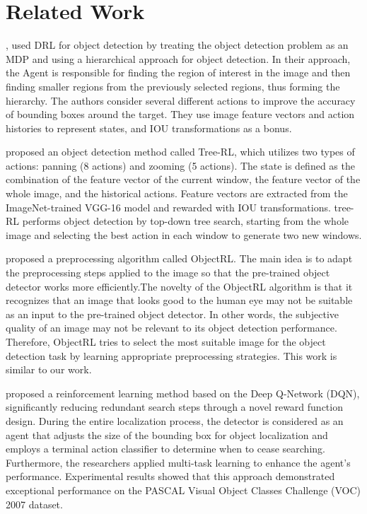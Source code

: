 \documentclass{PHlab-thesis}
\begin{document}
\section{Related Work}
\cite{caicedo2015active}, \cite{bueno2017hierarchical} used DRL for object detection by treating the object detection problem as an MDP and using a hierarchical approach for object detection. In their approach, the Agent is responsible for finding the region of interest in the image and then finding smaller regions from the previously selected regions, thus forming the hierarchy. The authors consider several different actions to improve the accuracy of bounding boxes around the target. They use image feature vectors and action histories to represent states, and IOU transformations as a bonus.

\cite{jie2016tree} proposed an object detection method called Tree-RL, which utilizes two types of actions: panning (8 actions) and zooming (5 actions). The state is defined as the combination of the feature vector of the current window, the feature vector of the whole image, and the historical actions. Feature vectors are extracted from the ImageNet-trained VGG-16 model and rewarded with IOU transformations. tree-RL performs object detection by top-down tree search, starting from the whole image and selecting the best action in each window to generate two new windows.

\cite{nayak2020reinforcement} proposed a preprocessing algorithm called ObjectRL. The main idea is to adapt the preprocessing steps applied to the image so that the pre-trained object detector works more efficiently.The novelty of the ObjectRL algorithm is that it recognizes that an image that looks good to the human eye may not be suitable as an input to the pre-trained object detector. In other words, the subjective quality of an image may not be relevant to its object detection performance. Therefore, ObjectRL tries to select the most suitable image for the object detection task by learning appropriate preprocessing strategies. This work is similar to our work.

\cite{wang2018multitask} proposed a reinforcement learning method based on the Deep Q-Network (DQN), significantly reducing redundant search steps through a novel reward function design. During the entire localization process, the detector is considered as an agent that adjusts the size of the bounding box for object localization and employs a terminal action classifier to determine when to cease searching. Furthermore, the researchers applied multi-task learning to enhance the agent's performance. Experimental results showed that this approach demonstrated exceptional performance on the PASCAL Visual Object Classes Challenge (VOC) 2007 dataset.
\end{document}
